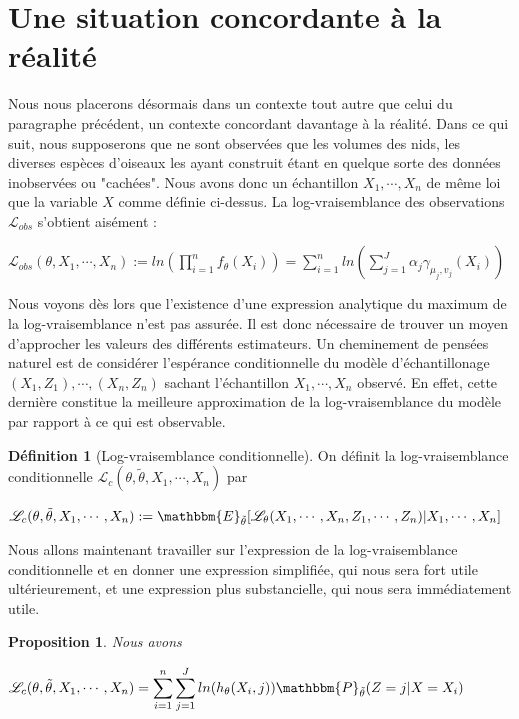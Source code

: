 \documentclass[frenchb]{report}
\newcommand{\1}{\mathbbm{1}}
\newcommand{\E}{\mathbbm{E}}
\newcommand{\prob}{\mathbbm{P}}
\newcommand{\lv}{\mathcal{L}}
\newcommand{\thetat}{\tilde{\theta}}
\newtheorem{prop}{Proposition}
\theoremstyle{definition}\newtheorem{defn}{Définition}
\theoremstyle{definition}\newtheorem{exm}{Exemple}
\theoremstyle{definition}\newtheorem{nota}{Notation}
\theoremstyle{definition}\newtheorem{rem}{Remarque}
\begin{document}
\section{Une situation concordante à la réalité} %
Nous nous placerons désormais dans un contexte tout autre que celui du paragraphe précédent, un contexte concordant davantage à la réalité. Dans ce qui suit, nous supposerons que ne sont observées que les volumes des nids, les diverses espèces d'oiseaux les ayant construit étant en quelque sorte des données inobservées ou "cachées". Nous avons donc un échantillon $X_1,\cdots, X_n$ de même loi que la variable $X$ comme définie ci-dessus. \newline
La log-vraisemblance des observations $\mathcal{L}_{obs}$ s'obtient aisément : 
\begin{center} $\mathcal{L}_{obs}(\theta, X_1, \cdots, X_n) := ln\left( \displaystyle\prod_{i=1}^n f_\theta(X_i) \right) = \displaystyle\sum_{i=1}^nln\left( \sum_{j=1}^J \alpha_j \gamma_{\mu_j, v_j}(X_i) \right)$ \end{center}
Nous voyons dès lors que l'existence d'une expression analytique du maximum de la log-vraisemblance n'est pas assurée. Il est donc nécessaire de trouver un moyen d'approcher les valeurs des différents estimateurs. \newline
Un cheminement de pensées naturel est de considérer l'espérance conditionnelle du modèle d'échantillonage $(X_1, Z_1),\cdots, (X_n, Z_n)$ sachant l'échantillon $X_1, \cdots, X_n$ observé. En effet, cette dernière constitue la meilleure approximation de la log-vraisemblance du modèle par rapport à ce qui est observable.

\begin{defn}[Log-vraisemblance conditionnelle]
On définit la log-vraisemblance conditionnelle $\lv_{c}(\theta, \thetat, X_1, \cdots, X_n) $ par
\begin{center} $\lv_{c}(\theta, \thetat, X_1, \cdots, X_n) := \E_{\thetat}[\lv_\theta(X_1, \cdots, X_n, Z_1, \cdots, Z_n) | X_1, \cdots, X_n]$ \end{center}
\end{defn}

Nous allons maintenant travailler sur l'expression de la log-vraisemblance conditionnelle et en donner une expression simplifiée, qui nous sera fort utile ultérieurement, et une expression plus substancielle, qui nous sera immédiatement utile.

\begin{prop}
Nous avons
\begin{center} $\lv_{c}(\theta, \thetat, X_1, \cdots, X_n) = \displaystyle\sum_{i=1}^n\sum_{j=1}^J ln(h_\theta(X_i ,j))  \prob_{\thetat}(Z = j|X = X_i)$ \end{center}
\end{prop}
\end{document}
